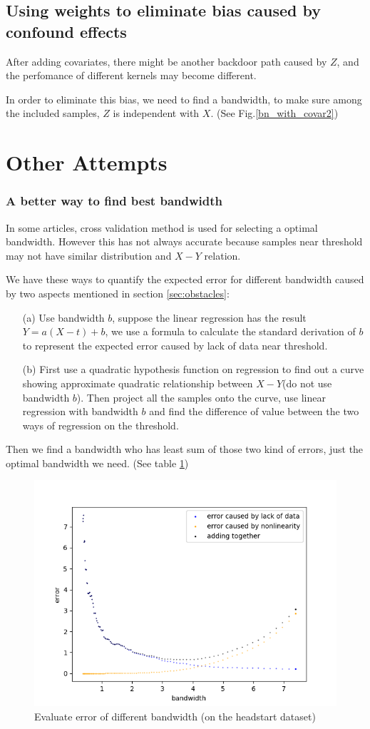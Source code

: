 \documentclass[a4 paper,12pt]{article}
\begin{document}
\subsection{Using weights to eliminate bias caused by confound effects}
After adding covariates, there might be another backdoor path caused by $Z$, and the perfomance of different kernels may become different.

In order to eliminate this bias, we need to find a bandwidth, to make sure among the included samples, $Z$ is independent with $X$. (See Fig.\ref{bn_with_covar2})

\section{Other Attempts}
\subsubsection*{A better way to find best bandwidth}

In some articles, cross validation method is used for selecting a optimal bandwidth. However this has not always accurate because samples near threshold may not have similar distribution and $X-Y$ relation.

We have these ways to quantify the expected error for different bandwidth caused by two aspects mentioned in section \ref{sec:obstacles}:

\begin{enumerate}
   \item[(a)] Use bandwidth $b$, suppose the linear regression has the result $Y=a(X-t)+b$, we use a formula to calculate the standard derivation of $b$ to represent the expected error caused by lack of data near threshold.
   \item[(b)] First use a quadratic hypothesis function on regression to find out a curve showing approximate quadratic relationship between $X-Y$(do not use bandwidth $b$). Then project all the samples onto the curve, use linear regression with bandwidth $b$ and find the difference of value between the two ways of regression on the threshold. 
\end{enumerate}

Then we find a bandwidth who has least sum of those two kind of errors, just the optimal bandwidth we need. (See table \ref{table:opt bandwidth})

\begin{figure}[h]
	\centering
	\includegraphics[scale=1]{Figure_5.png}
	\caption{Evaluate error of different bandwidth (on the headstart dataset)}
	\label{table:opt bandwidth}
\end{figure}
\end{document}
